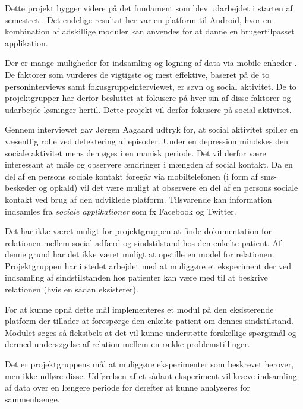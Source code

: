 Dette projekt bygger videre på det fundament som blev udarbejdet i starten af semestret \citefaelles{}.
Det endelige resultat her var en platform til Android, hvor en kombination af adskillige moduler kan anvendes for at danne en brugertilpasset applikation.

Der er mange muligheder  for indsamling og logning af data via mobile enheder .
De faktorer som vurderes de vigtigste og mest effektive, baseret på de to personinterviews samt fokusgruppeinterviewet, er søvn og social aktivitet.
De to projektgrupper har derfor besluttet at fokusere på hver sin af disse faktorer og udarbejde løsninger hertil.
Dette projekt vil derfor fokusere på social aktivitet.

Gennem interviewet gav Jørgen Aagaard udtryk for, at social aktivitet spiller en væsentlig rolle ved detektering af episoder.
Under en depression mindskes den sociale aktivitet mens den øges i en manisk periode.
Det vil derfor være interessant at måle og observere ændringer i mængden af social kontakt.
Da en del af en persons sociale kontakt foregår via mobiltelefonen (i form af sms-beskeder og opkald) vil det være muligt at observere en del af en persons sociale kontakt ved brug af den udviklede platform.
Tilsvarende kan information indsamles fra \textit{sociale applikationer} som fx Facebook og Twitter.

Det har ikke været muligt for projektgruppen at finde dokumentation for relationen mellem social adfærd og sindstilstand hos den enkelte patient.
Af denne grund har det ikke været muligt at opstille en model for relationen.
Projektgruppen har i stedet arbejdet med at muliggøre et eksperiment der ved indsamling af sindstilstanden hos patienter kan være med til at beskrive relationen (hvis en sådan eksisterer).

For at kunne opnå dette mål implementeres et modul på den eksisterende platform \citefaelles{} der tillader at forespørge den enkelte patient om dennes sindstilstand.
Modulet søges så fleksibelt at det vil kunne understøtte forskellige spørgsmål og dermed undersøgelse af relation mellem en række problemstillinger.

Det er projektgruppens mål at muliggøre eksperimenter som beskrevet herover, men ikke udføre disse.
Udførelsen af et sådant eksperiment vil kræve indsamling af data over en længere periode for derefter at kunne analyseres for sammenhænge.